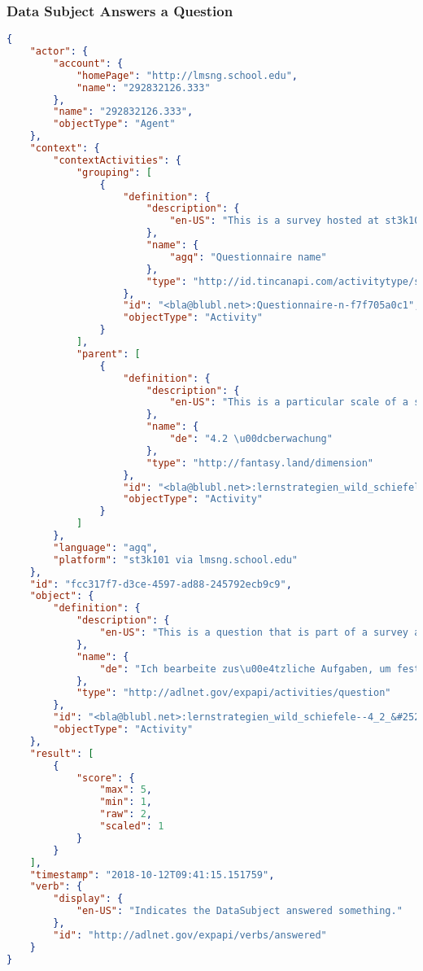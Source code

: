 \subsubsection*{Data Subject Answers a Question}
\begin{lstlisting}[language=JSON]
{
    "actor": {
        "account": {
            "homePage": "http://lmsng.school.edu",
            "name": "292832126.333"
        },
        "name": "292832126.333",
        "objectType": "Agent"
    },
    "context": {
        "contextActivities": {
            "grouping": [
                {
                    "definition": {
                        "description": {
                            "en-US": "This is a survey hosted at st3k101."
                        },
                        "name": {
                            "agq": "Questionnaire name"
                        },
                        "type": "http://id.tincanapi.com/activitytype/survey"
                    },
                    "id": "<bla@blubl.net>:Questionnaire-n-f7f705a0c1",
                    "objectType": "Activity"
                }
            ],
            "parent": [
                {
                    "definition": {
                        "description": {
                            "en-US": "This is a particular scale of a survey, it usually contains multiple questions."
                        },
                        "name": {
                            "de": "4.2 \u00dcberwachung"
                        },
                        "type": "http://fantasy.land/dimension"
                    },
                    "id": "<bla@blubl.net>:lernstrategien_wild_schiefele--4_2_&#252;berwachung",
                    "objectType": "Activity"
                }
            ]
        },
        "language": "agq",
        "platform": "st3k101 via lmsng.school.edu"
    },
    "id": "fcc317f7-d3ce-4597-ad88-245792ecb9c9",
    "object": {
        "definition": {
            "description": {
                "en-US": "This is a question that is part of a survey at st3k101."
            },
            "name": {
                "de": "Ich bearbeite zus\u00e4tzliche Aufgaben, um festzustellen, ob ich den Stoff wirklich verstanden habe."
            },
            "type": "http://adlnet.gov/expapi/activities/question"
        },
        "id": "<bla@blubl.net>:lernstrategien_wild_schiefele--4_2_&#252;berwachung--7",
        "objectType": "Activity"
    },
    "result": [
        {
            "score": {
                "max": 5,
                "min": 1,
                "raw": 2,
                "scaled": 1
            }
        }
    ],
    "timestamp": "2018-10-12T09:41:15.151759",
    "verb": {
        "display": {
            "en-US": "Indicates the DataSubject answered something."
        },
        "id": "http://adlnet.gov/expapi/verbs/answered"
    }
}                 
\end{lstlisting}


